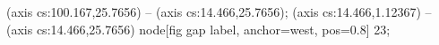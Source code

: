  (axis cs:100.167,25.7656) -- (axis cs:14.466,25.7656);
 (axis cs:14.466,1.12367) -- (axis cs:14.466,25.7656)
  node[fig gap label, anchor=west, pos=0.8] {\texttimes{}23};
